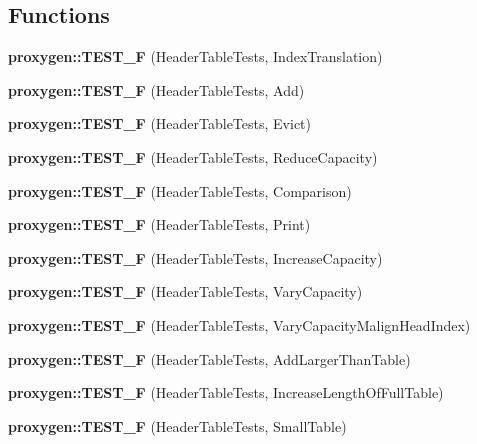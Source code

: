 \subsection*{Functions}
\begin{DoxyCompactItemize}
\item 
{\bf proxygen\+::\+T\+E\+S\+T\+\_\+F} (Header\+Table\+Tests, Index\+Translation)
\item 
{\bf proxygen\+::\+T\+E\+S\+T\+\_\+F} (Header\+Table\+Tests, Add)
\item 
{\bf proxygen\+::\+T\+E\+S\+T\+\_\+F} (Header\+Table\+Tests, Evict)
\item 
{\bf proxygen\+::\+T\+E\+S\+T\+\_\+F} (Header\+Table\+Tests, Reduce\+Capacity)
\item 
{\bf proxygen\+::\+T\+E\+S\+T\+\_\+F} (Header\+Table\+Tests, Comparison)
\item 
{\bf proxygen\+::\+T\+E\+S\+T\+\_\+F} (Header\+Table\+Tests, Print)
\item 
{\bf proxygen\+::\+T\+E\+S\+T\+\_\+F} (Header\+Table\+Tests, Increase\+Capacity)
\item 
{\bf proxygen\+::\+T\+E\+S\+T\+\_\+F} (Header\+Table\+Tests, Vary\+Capacity)
\item 
{\bf proxygen\+::\+T\+E\+S\+T\+\_\+F} (Header\+Table\+Tests, Vary\+Capacity\+Malign\+Head\+Index)
\item 
{\bf proxygen\+::\+T\+E\+S\+T\+\_\+F} (Header\+Table\+Tests, Add\+Larger\+Than\+Table)
\item 
{\bf proxygen\+::\+T\+E\+S\+T\+\_\+F} (Header\+Table\+Tests, Increase\+Length\+Of\+Full\+Table)
\item 
{\bf proxygen\+::\+T\+E\+S\+T\+\_\+F} (Header\+Table\+Tests, Small\+Table)
\end{DoxyCompactItemize}

